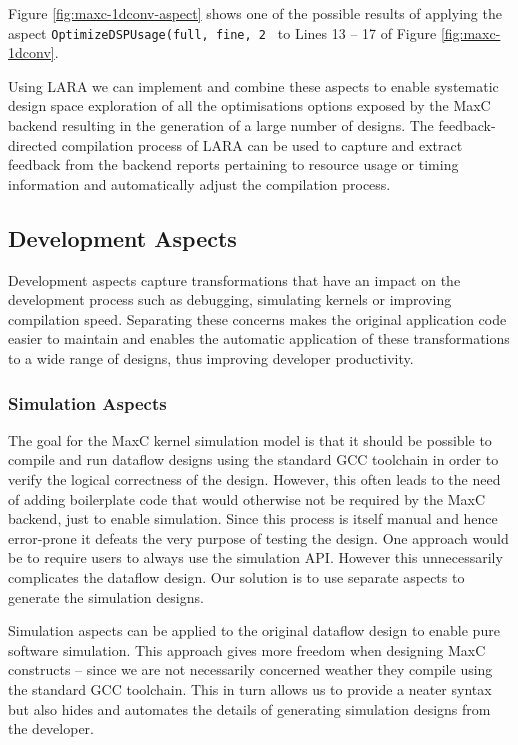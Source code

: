Figure \ref{fig:maxc-1dconv-aspect} shows one of the possible results
of applying the aspect \texttt{OptimizeDSPUsage(full, fine, 2 } to
Lines 13 -- 17 of Figure \ref{fig:maxc-1dconv}.

Using LARA we can implement and combine these aspects to enable
systematic design space exploration of all the optimisations options
exposed by the MaxC backend resulting in the generation of a large
number of designs. The feedback-directed compilation process of LARA can
be used to capture and extract feedback from the backend reports
pertaining to resource usage or timing information and automatically
adjust the compilation process.

\subsection{Development Aspects}

Development aspects capture transformations that have an impact on the
development process such as debugging, simulating kernels or improving
compilation speed. Separating these concerns makes the original
application code easier to maintain and enables the automatic
application of these transformations to a wide range of designs, thus
improving developer productivity.

\subsubsection{Simulation Aspects}

The goal for the MaxC kernel simulation model is that it should be
possible to compile and run dataflow designs using the standard GCC
toolchain in order to verify the logical correctness of the
design. However, this often leads to the need of adding boilerplate
code that would otherwise not be required by the MaxC backend, just to
enable simulation. Since this process is itself manual and hence
error-prone it defeats the very purpose of testing the design. One
approach would be to require users to always use the simulation
API. However this unnecessarily complicates the dataflow design. Our
solution is to use separate aspects to generate the simulation
designs.

Simulation aspects can be applied to the original dataflow design to
enable pure software simulation. This approach gives more freedom when
designing MaxC constructs -- since we are not necessarily concerned
weather they compile using the standard GCC toolchain. This in turn
allows us to provide a neater syntax but also hides and automates the
details of generating simulation designs from the developer.

